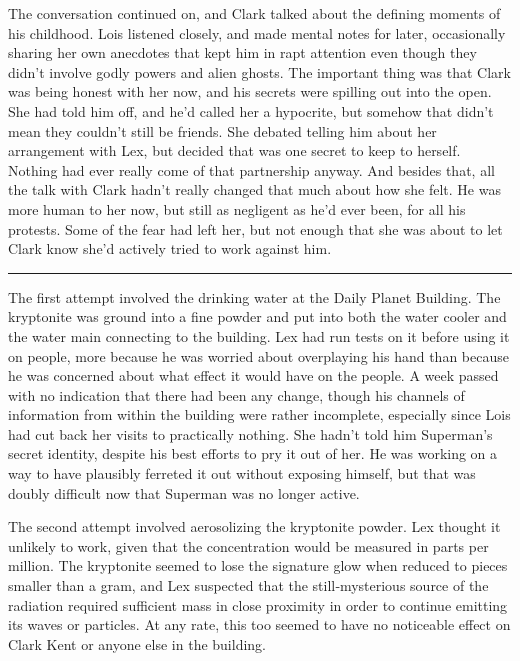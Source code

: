 \documentclass[ebook,12pt]{memoir}
\begin{document}
The conversation continued on, and Clark talked about the defining
moments of his childhood. Lois listened closely, and made mental notes
for later, occasionally sharing her own anecdotes that kept him in rapt
attention even though they didn't involve godly powers and alien ghosts.
The important thing was that Clark was being honest with her now, and
his secrets were spilling out into the open. She had told him off, and
he'd called her a hypocrite, but somehow that didn't mean they couldn't
still be friends. She debated telling him about her arrangement with
Lex, but decided that was one secret to keep to herself. Nothing had
ever really come of that partnership anyway. And besides that, all the
talk with Clark hadn't really changed that much about how she felt. He
was more human to her now, but still as negligent as he'd ever been, for
all his protests. Some of the fear had left her, but not enough that she
was about to let Clark know she'd actively tried to work against him.

\begin{center}\rule{0.5\linewidth}{0.5pt}\end{center}

The first attempt involved the drinking water at the Daily Planet
Building. The kryptonite was ground into a fine powder and put into both
the water cooler and the water main connecting to the building. Lex had
run tests on it before using it on people, more because he was worried
about overplaying his hand than because he was concerned about what
effect it would have on the people. A week passed with no indication
that there had been any change, though his channels of information from
within the building were rather incomplete, especially since Lois had
cut back her visits to practically nothing. She hadn't told him
Superman's secret identity, despite his best efforts to pry it out of
her. He was working on a way to have plausibly ferreted it out without
exposing himself, but that was doubly difficult now that Superman was no
longer active.

The second attempt involved aerosolizing the kryptonite powder. Lex
thought it unlikely to work, given that the concentration would be
measured in parts per million. The kryptonite seemed to lose the
signature glow when reduced to pieces smaller than a gram, and Lex
suspected that the still‐mysterious source of the radiation required
sufficient mass in close proximity in order to continue emitting its
waves or particles. At any rate, this too seemed to have no noticeable
effect on Clark Kent or anyone else in the building.
\end{document}
